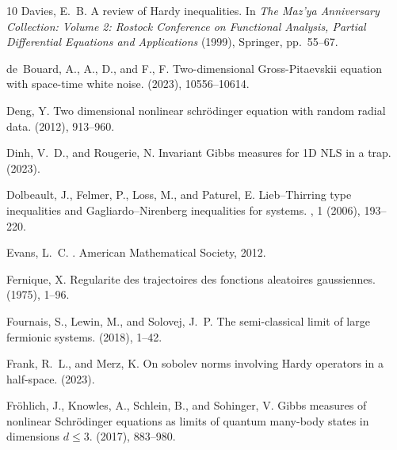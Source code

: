 \documentclass[%
11pt,  reqno]{amsart}
\theoremstyle{remarkstyle}
\newcommand{\1}{\hspace{0.2mm}\text{I}\hspace{0.2mm}}
\numberwithin{equation}{section}
\numberwithin{theorem}{section}
\begin{document}
\begin{thebibliography}{10}
		{\sc Davies, E.~B.}
		\newblock A review of {H}ardy inequalities.
		\newblock In {\em The Maz'ya Anniversary Collection: Volume 2: Rostock
			Conference on Functional Analysis, Partial Differential Equations and
			Applications\/} (1999), Springer, pp.~55--67.
		
		{\sc de~Bouard, A., A., D., and F., F.}
		\newblock Two-dimensional {Gross-Pitaevskii} equation with space-time white
		noise.
		 (2023),
		10556--10614.
		
		{\sc Deng, Y.}
		\newblock Two dimensional nonlinear schr\"odinger equation with random radial
		data.
		 (2012),
		913--960.
		
		{\sc Dinh, V.~D., and Rougerie, N.}
		\newblock Invariant {G}ibbs measures for {1D NLS} in a trap.
		 (2023).
		
		{\sc Dolbeault, J., Felmer, P., Loss, M., and Paturel, E.}
		\newblock Lieb--{T}hirring type inequalities and {G}agliardo--{N}irenberg
		inequalities for systems.
		, 1 (2006), 193--220.
		
		{\sc Evans, L.~C.}
		.
		\newblock American Mathematical Society, 2012.
		
		{\sc Fernique, X.}
		\newblock Regularite des trajectoires des fonctions aleatoires gaussiennes.
		(1975), 1--96.
		
		{\sc Fournais, S., Lewin, M., and Solovej, J.~P.}
		\newblock The semi-classical limit of large fermionic systems.
		(2018), 1--42.
		
		{\sc Frank, R.~L., and Merz, K.}
		\newblock On sobolev norms involving {H}ardy operators in a half-space.
		 (2023).
		
		{\sc Fr\"ohlich, J., Knowles, A., Schlein, B., and Sohinger, V.}
		\newblock Gibbs measures of nonlinear {S}chrödinger equations as limits of
		quantum many-body states in dimensions $d \leq 3$.
		 (2017), 883--980.
		

\end{thebibliography}
\end{document}
